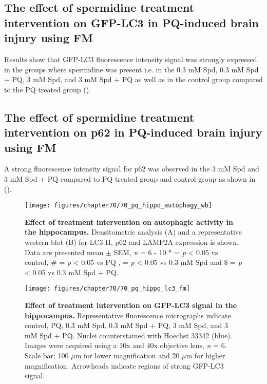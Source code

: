 \subsection{The effect of spermidine treatment intervention on GFP-LC3  in PQ-induced brain injury using FM}
Results show that GFP-LC3 fluorescence intensity signal was strongly expressed in the groups where spermidine was present i.e. in the 0.3 mM Spd, 0.3 mM Spd + PQ, 3 mM Spd, and 3 mM Spd + PQ as well as in the control group compared to the PQ treated group ().

\subsection{The effect of spermidine treatment intervention on p62 in PQ-induced brain injury using FM}
A strong fluorescence intensity signal for p62 was observed in the 3 mM Spd and 3 mM Spd + PQ compared to PQ treated group and control group as shown in ().

\begin{landscape}
\begin{figure}[!htbp]
\center
  \texttt{[image: figures/chapter70/70\_pq\_hippo\_autophagy\_wb]}
  \caption[Effect of treatment intervention on autophagic activity in the hippocampus]{\textbf{Effect of treatment intervention on autophagic activity in the hippocampus.} Densitometric analysis (A) and a representative western blot (B) for LC3 II, p62 and LAMP2A expression is shown. Data are presented  mean $\pm$ SEM, \textit{n} = 6 - 10.* = \textit{p} < 0.05 vs control, \# = \textit{p} < 0.05 vs PQ , \@ = \textit{p} < 0.05 vs 0.3 mM Spd and \$ = \textit{p} < 0.05 vs 0.3 mM Spd + PQ.}
  \label{fig:70_pq_hippo_autophagy_wb}
\end{figure} 
\end{landscape}

\begin{landscape}
\begin{figure}[!htbp]
\center
  \texttt{[image: figures/chapter70/70\_pq\_hippo\_lc3\_fm]}
  \caption[Effect of treatment intervention on GFP-LC3 signal in the hippocampus]{\textbf{Effect of treatment intervention on GFP-LC3 signal in the hippocampus.} Representative fluorescence micrographs indicate control, PQ, 0.3 mM Spd, 0.3 mM Spd + PQ, 3 mM Spd, and 3 mM Spd + PQ. Nuclei counterstained with Hoechst 33342 (blue). Images were acquired using a 10x and 40x objective lens, \textit{n} = 6. Scale bar: 100 $\mu$m for lower magnification and 20 $\mu$m for higher magnification. Arrowheads indicate regions of strong GFP-LC3 signal.}
  \label{fig:70_pq_hippo_lc3_fm}
\end{figure} 
\end{landscape}

